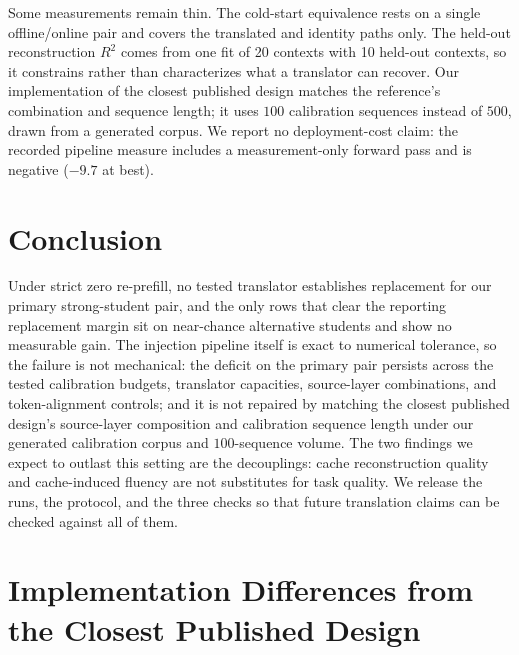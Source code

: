 \documentclass{article} %
\begin{document}
Some measurements remain thin. The cold-start equivalence rests on a single
offline/online pair and covers the translated and identity paths only. The
held-out reconstruction $R^2$ comes from one fit of 20 contexts with 10 held-out
contexts, so it constrains rather than characterizes what a translator can recover.
Our implementation of the closest published design matches the reference's
combination and sequence length; it uses $100$ calibration sequences instead of
$500$, drawn from a generated corpus. We report no deployment-cost claim: the
recorded pipeline measure includes a measurement-only forward pass and is
negative ($-9.7$ at best).


\section{Conclusion}
\label{sec:conclusion}

Under strict zero re-prefill, no tested translator establishes replacement for
our primary strong-student pair, and the only rows that clear the reporting
replacement margin sit on near-chance alternative students and show no
measurable gain. The injection pipeline itself is exact to numerical
tolerance, so the failure is not mechanical: the deficit on the primary pair
persists across the tested calibration
budgets, translator capacities, source-layer combinations, and token-alignment
controls; and it is not repaired by matching the closest published design's
source-layer composition and calibration sequence length under our generated
calibration corpus and $100$-sequence volume. The
two findings we expect to outlast this setting are the decouplings: cache
reconstruction quality and cache-induced fluency are not substitutes for task
quality. We release the runs, the protocol, and the three checks so that future
translation claims can be checked against all of them.





\appendix

\section{Implementation Differences from the Closest Published Design}
\label{app:impl}
\end{document}
